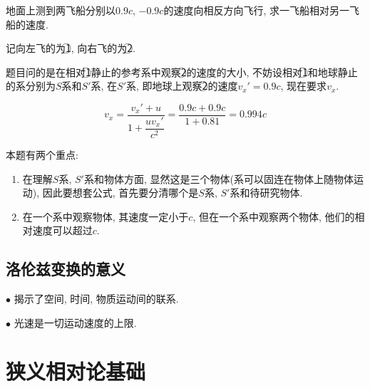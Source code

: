 \begin{example}
	地面上测到两飞船分别以$0.9c$, $-0.9c$的速度向相反方向飞行, 求一飞船相对另一飞船的速度. 
	
	\begin{solution}
		
		记向左飞的为\textcircled{1}, 向右飞的为\textcircled{2}.
		
		题目问的是在相对\textcircled{1}静止的参考系中观察\textcircled{2}的速度的大小, 不妨设相对\textcircled{1}和地球静止的系分别为$S$系和$S'$系, 在$S'$系, 即地球上观察\textcircled{2}的速度$v_x' = 0.9c$, 现在要求$v_x$.
		
		\begin{equation*}
			v_x = \dfrac{v_x' + u}{1 + \dfrac{u v_x'}{c^2}} = \dfrac{0.9c + 0.9c}{1 + 0.81} = 0.994c
		\end{equation*}
		
	\end{solution}
	
	\begin{note}
		
		本题有两个重点: 
		
		\begin{enumerate}
			
			\item 在理解$S$系, $S'$系和物体方面, 显然这是三个物体(系可以固连在物体上随物体运动), 因此要想套公式, 首先要分清哪个是$S$系, $S'$系和待研究物体. 
			
			\item 在一个系中观察物体, 其速度一定小于$c$, 但在一个系中观察两个物体, 他们的相对速度可以超过$c$. 
			
		\end{enumerate}
		
	\end{note}
	
\end{example}

\subsection{洛伦兹变换的意义}

$\bullet$ 揭示了空间, 时间, 物质运动间的联系. 

$\bullet$ 光速是一切运动速度的上限. 

\section{狭义相对论基础}\label{6.3}

